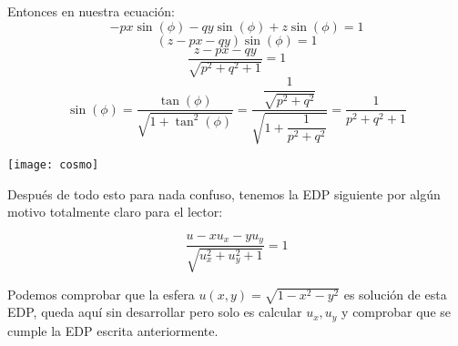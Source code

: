 \documentclass[openany]{book}
\begin{document}
Entonces en nuestra ecuación:
$$ -px \sin(\phi)-qy \sin(\phi) +z \sin(\phi) = 1 $$
$$ (z-px-qy) \sin(\phi) = 1 $$
$$ \dfrac{z-px-qy}{\sqrt{p^2+q^2+1}} = 1 $$
$$ \sin(\phi) = \dfrac{\tan(\phi)}{\sqrt{1+\tan^2(\phi)}} = \dfrac{\dfrac{1}{\sqrt{p^2+q^2}}}{\sqrt{1+\dfrac{1}{p^2+q^2}}} = \dfrac{1}{p^2+q^2+1}$$

\begin{minipage}[l]{0.1\textwidth}
  \texttt{[image: cosmo]}
  \end{minipage}
  \begin{minipage}[l]{0.8\textwidth}
  Después de todo esto para nada confuso, tenemos la EDP siguiente por algún motivo totalmente claro para el lector:
\end{minipage}


$$ \dfrac{u-xu_{x}-yu_{y}}{\sqrt{u_{x}^2+u_{y}^2+1}} =1$$

Podemos comprobar que la esfera $ u(x,y)=\sqrt{1-x^2-y^2} $ es solución de esta EDP, queda aquí sin desarrollar pero solo es calcular $ u_{x},u_{y} $ y comprobar que se cumple la EDP escrita anteriormente.
\end{document}

